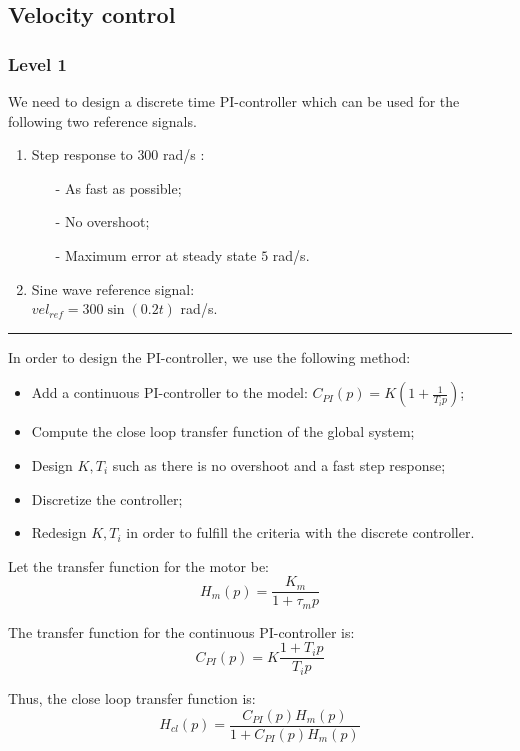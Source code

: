 \subsection*{Velocity control}

\subsubsection*{Level 1}

We need to design a discrete time PI-controller which can be used for the following two reference signals.

\begin{enumerate}
 \item Step response to $300$ rad/s :
 \begin{itemize}
  \item[-] As fast as possible;
  \item[-] No overshoot;
  \item[-] Maximum error at steady state $5$ rad/s.
 \end{itemize}
  \item Sine wave reference signal: \\ $vel_{ref} = 300 \sin(0.2t)$ rad/s.
\end{enumerate}

\begin{center} \noindent\rule{6cm}{0.1pt} \end{center}


In order to design the PI-controller, we use the following method:
\begin{itemize}
 \item Add a continuous PI-controller to the model: $C_{PI}(p) = K(1 + \frac{1}{T_i p})$;
 \item Compute the close loop transfer function of the global system;
 \item Design $K,T_i$ such as there is no overshoot and a fast step response;
 \item Discretize the controller;
 \item Redesign $K,T_i$ in order to fulfill the criteria with the discrete controller.
\end{itemize}

Let the transfer function for the motor be: $$H_{m}(p) = \frac{K_{m}}{1 + \tau_{m} p}$$

The transfer function for the continuous PI-controller is: $$C_{PI}(p) = K\frac{1 + T_i p}{T_i p}$$

Thus, the close loop transfer function is: \begin{equation} \label{eq1} H_{cl}(p) = \frac{C_{PI}(p) H_{m}(p)}{1 + C_{PI}(p) H_{m}(p)} \end{equation}

